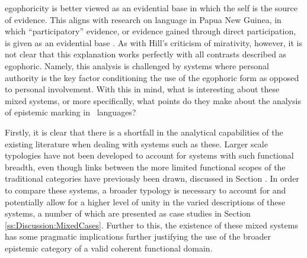 egophoricity is better viewed as an evidential base in which the self is the source of evidence. This aligns with research on language in Papua New Guinea, in which ``participatory'' evidence, or evidence gained through direct participation, is given as an evidential base \cite{SanRoque2012}. As with Hill's criticism of mirativity, however, it is not clear that this explanation works perfectly with all contrasts described as egophoric. Namely, this analysis is challenged by systems where personal authority is the key factor conditioning the use of the egophoric form as opposed to personal involvement. With this in mind, what is interesting about these mixed systems, or more specifically, what points do they make about the analysis of epistemic marking in \lfam\ languages?

Firstly, it is clear that there is a shortfall in the analytical capabilities of the existing literature when dealing with systems such as these. Larger scale typologies have not been developed to account for systems with such functional breadth, even though links between the more limited functional scopes of the traditional categories have previously been drawn, discussed in Section . In order to compare these systems, a broader typology is necessary to account for and potentially allow for a higher level of unity in the varied descriptions of these systems, a number of which are presented as case studies in Section \ref{ss:Discussion:MixedCases}. Further to this, the existence of these mixed systems has some pragmatic implications further justifying the use of the broader epistemic category of a valid coherent functional domain.

